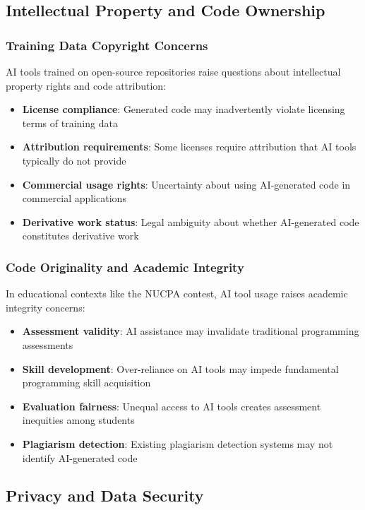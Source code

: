 \documentclass[conference]{IEEEtran}
\begin{document}
\subsection{Intellectual Property and Code Ownership}

\subsubsection{Training Data Copyright Concerns}
AI tools trained on open-source repositories raise questions about intellectual property rights and code attribution:

\begin{itemize}
    \item \textbf{License compliance}: Generated code may inadvertently violate licensing terms of training data
    \item \textbf{Attribution requirements}: Some licenses require attribution that AI tools typically do not provide
    \item \textbf{Commercial usage rights}: Uncertainty about using AI-generated code in commercial applications
    \item \textbf{Derivative work status}: Legal ambiguity about whether AI-generated code constitutes derivative work
\end{itemize}

\subsubsection{Code Originality and Academic Integrity}

In educational contexts like the NUCPA contest, AI tool usage raises academic integrity concerns:

\begin{itemize}
    \item \textbf{Assessment validity}: AI assistance may invalidate traditional programming assessments
    \item \textbf{Skill development}: Over-reliance on AI tools may impede fundamental programming skill acquisition
    \item \textbf{Evaluation fairness}: Unequal access to AI tools creates assessment inequities among students
    \item \textbf{Plagiarism detection}: Existing plagiarism detection systems may not identify AI-generated code
\end{itemize}

\subsection{Privacy and Data Security}
\end{document}
